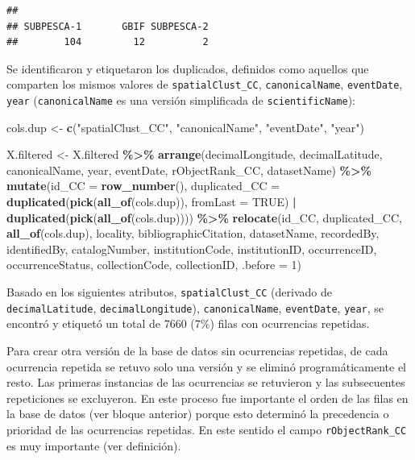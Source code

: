 \documentclass[sn-apa,pdflatex]{sn-jnl}
\newenvironment{Shaded}{\begin{snugshade}}{\end{snugshade}}
\newcommand{\AttributeTok}[1]{\textcolor[rgb]{0.13,0.29,0.53}{#1}}
\newcommand{\ConstantTok}[1]{\textcolor[rgb]{0.56,0.35,0.01}{#1}}
\newcommand{\DecValTok}[1]{\textcolor[rgb]{0.00,0.00,0.81}{#1}}
\newcommand{\FunctionTok}[1]{\textcolor[rgb]{0.13,0.29,0.53}{\textbf{#1}}}
\newcommand{\NormalTok}[1]{#1}
\newcommand{\OtherTok}[1]{\textcolor[rgb]{0.56,0.35,0.01}{#1}}
\newcommand{\SpecialCharTok}[1]{\textcolor[rgb]{0.81,0.36,0.00}{\textbf{#1}}}
\newcommand{\StringTok}[1]{\textcolor[rgb]{0.31,0.60,0.02}{#1}}
\begin{document}
\begin{verbatim}
## 
## SUBPESCA-1       GBIF SUBPESCA-2 
##        104         12          2
\end{verbatim}

Se identificaron y etiquetaron los duplicados, definidos como aquellos
que comparten los mismos valores de \texttt{spatialClust\_CC},
\texttt{canonicalName}, \texttt{eventDate}, \texttt{year}
(\texttt{canonicalName} es una versión simplificada de
\texttt{scientificName}):

\begin{Shaded}
\begin{Highlighting}[]
\NormalTok{cols.dup }\OtherTok{\textless{}{-}} \FunctionTok{c}\NormalTok{(}\StringTok{"spatialClust\_CC"}\NormalTok{, }\StringTok{"canonicalName"}\NormalTok{, }\StringTok{"eventDate"}\NormalTok{,}
    \StringTok{"year"}\NormalTok{)}

\NormalTok{X.filtered }\OtherTok{\textless{}{-}}\NormalTok{ X.filtered }\SpecialCharTok{\%\textgreater{}\%}
    \FunctionTok{arrange}\NormalTok{(decimalLongitude, decimalLatitude, canonicalName,}
\NormalTok{        year, eventDate, rObjectRank\_CC, datasetName) }\SpecialCharTok{\%\textgreater{}\%}
    \FunctionTok{mutate}\NormalTok{(}\AttributeTok{id\_CC =} \FunctionTok{row\_number}\NormalTok{(), }\AttributeTok{duplicated\_CC =} \FunctionTok{duplicated}\NormalTok{(}\FunctionTok{pick}\NormalTok{(}\FunctionTok{all\_of}\NormalTok{(cols.dup)),}
        \AttributeTok{fromLast =} \ConstantTok{TRUE}\NormalTok{) }\SpecialCharTok{|} \FunctionTok{duplicated}\NormalTok{(}\FunctionTok{pick}\NormalTok{(}\FunctionTok{all\_of}\NormalTok{(cols.dup)))) }\SpecialCharTok{\%\textgreater{}\%}
    \FunctionTok{relocate}\NormalTok{(id\_CC, duplicated\_CC, }\FunctionTok{all\_of}\NormalTok{(cols.dup), locality,}
\NormalTok{        bibliographicCitation, datasetName, recordedBy, identifiedBy,}
\NormalTok{        catalogNumber, institutionCode, institutionID, occurrenceID,}
\NormalTok{        occurrenceStatus, collectionCode, collectionID, }\AttributeTok{.before =} \DecValTok{1}\NormalTok{)}
\end{Highlighting}
\end{Shaded}

Basado en los siguientes atributos, \texttt{spatialClust\_CC} (derivado
de \texttt{decimalLatitude}, \texttt{decimalLongitude}),
\texttt{canonicalName}, \texttt{eventDate}, \texttt{year}, se encontró y
etiquetó un total de 7660 (7\%) filas con ocurrencias repetidas.

Para crear otra versión de la base de datos sin ocurrencias repetidas,
de cada ocurrencia repetida se retuvo solo una versión y se eliminó
programáticamente el resto. Las primeras instancias de las ocurrencias
se retuvieron y las subsecuentes repeticiones se excluyeron. En este
proceso fue importante el orden de las filas en la base de datos (ver
bloque anterior) porque esto determinó la precedencia o prioridad de las
ocurrencias repetidas. En este sentido el campo \texttt{rObjectRank\_CC}
es muy importante (ver definición).
\end{document}
